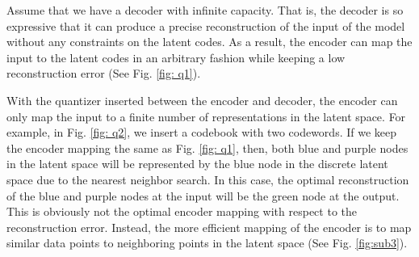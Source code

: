 \documentclass[letterpaper]{article} %
\begin{document}
Assume that we have a decoder with infinite capacity. That is, the decoder is so expressive that it can produce a precise reconstruction of the input of the model without any constraints on the latent codes. As a result, the encoder can map the input to the latent codes in an arbitrary fashion while keeping a low reconstruction error (See Fig. \ref{fig: q1}).

With the quantizer inserted between the encoder and decoder, the encoder can only map the input to a finite number of representations in the latent space. For example, in Fig. \ref{fig: q2}, we insert a codebook with two codewords. If we keep the encoder mapping the same as Fig. \ref{fig: q1}, then, both blue and purple nodes in the latent space will be represented by the blue node in the discrete latent space due to the nearest neighbor search. In this case, the optimal reconstruction of the blue and purple nodes at the input will be the green node at the output. This is obviously not the optimal encoder mapping with respect to the reconstruction error. Instead, the more efficient mapping of the encoder is to map similar data points to neighboring points in the latent space (See Fig. \ref{fig:sub3}).
\end{document}
